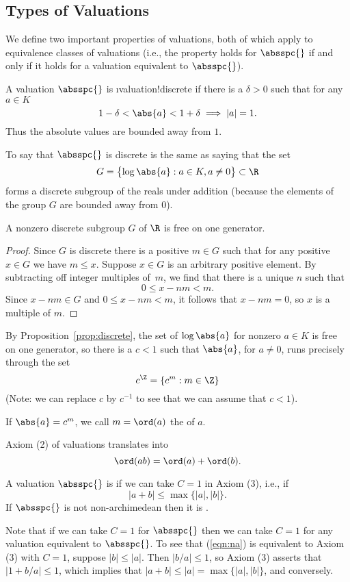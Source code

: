 \documentclass[11pt]{book}
\begin{document}
\begin{ch}
\section{Types of Valuations}
We define two important properties of valuations, both of which
apply to  equivalence classes of valuations (i.e., the property
holds for $\absspc{}$ if and only if it holds for a valuation
equivalent to $\absspc{}$).
\begin{definition}[Discrete]
A valuation $\absspc{}$ is \i{valuation!discrete}
if there is a $\delta>0$
such that for any $a\in K$
$$
   1-\delta < \abs{a} < 1+\delta \implies |a|=1.
$$
Thus the absolute values are bounded away from $1$.
\end{definition}
To say that $\absspc{}$ is discrete is the same as saying
that the set
$$G=\bigl\{
  \log\abs{a} : a \in K, a\neq 0
\bigr\} \subset \R
$$
forms a discrete subgroup of the reals under addition (because
the elements of the group $G$ are bounded away from $0$).
\begin{proposition}\label{prop:discrete}
A nonzero discrete subgroup $G$ of $\R$ is free on one generator.
\end{proposition}
\begin{proof}
Since $G$ is discrete there is a positive  $m\in G$
such that for any positive $x\in G$ we have $m\leq x$.
Suppose $x\in G$ is an arbitrary positive element.
By subtracting off integer multiples of~$m$, we
find that there is a unique $n$ such that
$$
   0\leq x-nm <m.
$$
Since $x-nm\in G$ and $0 \leq x-nm<m$, it follows
that $x-nm=0$, so $x$ is a multiple of $m$.
\end{proof}
By Proposition~\ref{prop:discrete}, the set
of $\log\abs{a}$ for nonzero $a\in K$
is free on one generator, so there
is a $c<1$ such that $\abs{a}$, for $a\neq 0$,
runs precisely through the set $$c^\Z = \{c^m : m\in \Z\}$$
(Note: we can replace $c$ by $c^{-1}$ to see that we
can assume that $c<1$).

\begin{definition}[Order]\label{def:ord}
If $\abs{a} = c^m$, we call $m=\ord(a)$ the 
of $a$.
\end{definition}
Axiom (2) of valuations
translates into
$$
  \ord(ab) = \ord(a) + \ord(b).
$$

\begin{definition}
A valuation $\absspc{}$ is 
if we can take $C=1$ in Axiom (3), i.e., if
\begin{equation}\label{eqn:na}
   |a + b| \leq \max\bigl\{|a|,|b|\bigr\}.
\end{equation}
If $\absspc{}$ is not non-archimedean then
it is .
\end{definition}
Note that if we can take $C=1$ for $\absspc{}$
then we can take $C=1$ for any valuation equivalent to
$\absspc{}$.
To see that (\ref{eqn:na}) is equivalent to Axiom (3) with
$C=1$, suppose $|b|\leq |a|$.  Then $|b/a|\leq 1$, so
Axiom (3) asserts that $|1+b/a|\leq 1$, which implies
that $|a+b| \leq |a| = \max\{|a|,|b|\}$, and conversely.


\end{ch}
\end{document}
